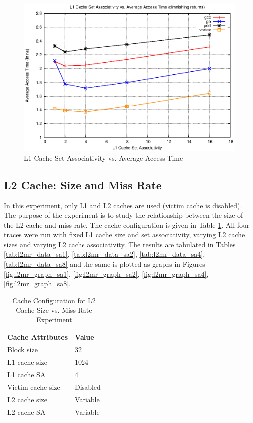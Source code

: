 \documentclass[a4paper]{article}
\begin{document}
\begin{figure}
    \centering
    \includegraphics[scale=1.32] {l1_aat.eps}
    \captionsetup{justification=centering}
    \caption{L1 Cache Set Associativity vs. Average Access Time}
    \label{fig:l1aat_graph}
\end{figure}

\subsection{L2 Cache: Size and Miss Rate}
In this experiment, only L1 and L2 caches are used (victim cache is disabled). The purpose of the experiment is to study the relationship between the size of the L2 cache and miss rate. The cache configuration is given in Table \ref{tab:l2mr_config}. All four traces were run with fixed L1 cache size and set associativity, varying L2 cache sizes and varying L2 cache associativity. The results are tabulated in Tables \ref{tab:l2mr_data_sa1}, \ref{tab:l2mr_data_sa2}, \ref{tab:l2mr_data_sa4}, \ref{tab:l2mr_data_sa8} and the same is plotted as graphs in Figures \ref{fig:l2mr_graph_sa1}, \ref{fig:l2mr_graph_sa2}, \ref{fig:l2mr_graph_sa4}, \ref{fig:l2mr_graph_sa8}.

\begin{table}[htbp]
    \centering
    \begin{center}
        \begin{tabular}{|l|l|}
            \hline
            \bf Cache Attributes & \bf Value \\ \hline
            Block size &  32 \\
            L1 cache size & 1024 \\
            L1 cache SA & 4 \\
            Victim cache size & Disabled \\
            L2 cache size & Variable \\
            L2 cache SA & Variable \\
            \hline
        \end{tabular}
        \captionsetup{justification=centering}
        \caption{Cache Configuration for L2 Cache Size vs. Miss Rate Experiment}
        \label{tab:l2mr_config}
    \end{center}
\end{table}
\end{document}
